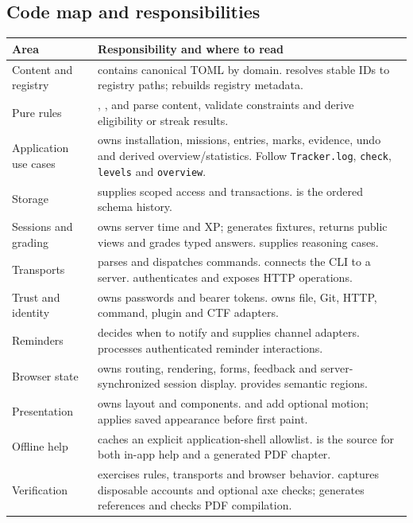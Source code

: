 \subsection{Code map and responsibilities}
\begin{longtable}{P{.25\textwidth}P{.67\textwidth}}
\textbf{Area} & \textbf{Responsibility and where to read}\\\hline
Content and registry &  contains canonical TOML by domain.
 resolves stable IDs to registry paths;
 rebuilds registry metadata.\\
Pure rules & , ,
 and  parse content,
validate constraints and derive eligibility or streak results.\\
Application use cases &  owns installation, missions,
entries, marks, evidence, undo and derived overview/statistics. Follow
\texttt{Tracker.log}, \texttt{check}, \texttt{levels} and \texttt{overview}.\\
Storage &  supplies scoped access and transactions.
 is the ordered schema history.\\
Sessions and grading &  owns server time and XP;
 generates fixtures, returns public views and grades
typed answers.  supplies reasoning cases.\\
Transports &  parses and dispatches commands.
 connects the CLI to a server.
 authenticates and exposes HTTP operations.\\
Trust and identity &  owns passwords and bearer tokens.
 owns file, Git, HTTP, command, plugin and CTF adapters.\\
Reminders &  decides when to notify and supplies channel adapters.
 processes authenticated reminder interactions.\\
Browser state &  owns routing, rendering, forms, feedback and
server-synchronized session display.  provides semantic regions.\\
Presentation &  owns layout and components.
 and  add optional motion;
 applies saved appearance before first paint.\\
Offline help &  caches an explicit application-shell allowlist.
 is the source for both in-app help and a generated PDF chapter.\\
Verification &  exercises rules, transports and browser behavior.
 captures disposable accounts and optional axe checks;
 generates references and checks PDF compilation.\\
\end{longtable}

